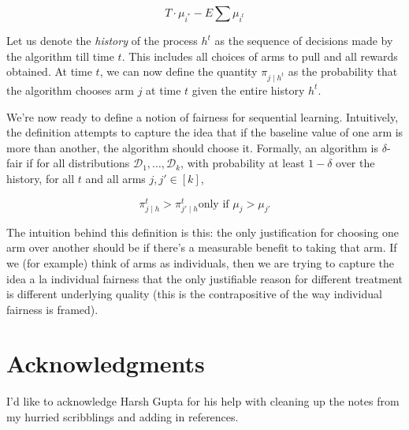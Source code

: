 \documentclass[11pt]{paper}
\begin{document}
\[ T \cdot \mu_{i^*} - E \sum \mu_{i^t} \]

Let us denote the \emph{history} of the process $h^t$ as the sequence of
decisions made by the algorithm till time $t$. This includes all choices
of arms to pull and all rewards obtained. At time $t$, we can now define
the quantity $\pi_{j \mid h^t}$ as the probability that the algorithm
chooses arm $j$ at time $t$ given the entire history $h^t$.

We're now ready to define a notion of fairness for sequential learning.
Intuitively, the definition attempts to capture the idea that if the
baseline value of one arm is more than another, the algorithm should
choose it. Formally, an algorithm is $\delta$-fair\citep{joseph_fairness_2016} if for all
distributions $\mathcal{D}_1, \ldots, \mathcal{D}_k$, with probability
at least $1-\delta$ over the history, for all $t$ and all arms
$j, j' \in [k]$,

\[ \pi^t_{j\mid h} > \pi^t_{j' \mid h} \text{only if  } \mu_j > \mu_{j'} ​\]

The intuition behind this definition is this: the only justification for
choosing one arm over another should be if there's a measurable benefit
to taking that arm. If we (for example) think of arms as individuals,
then we are trying to capture the idea a la individual fairness that the
only justifiable reason for different treatment is different underlying
quality (this is the contrapositive of the way individual fairness is
framed).

\section{Acknowledgments}
\label{sec:acknowledgments}

I'd like to acknowledge Harsh Gupta for his help with cleaning up the notes from
my hurried scribblings and adding in references. 






\end{document}

